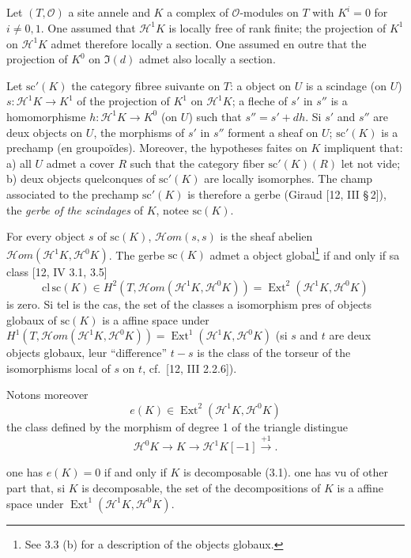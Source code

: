 \documentclass[12pt,a4paper]{article}
\theoremstyle{plain}
\theoremstyle{definition}
\theoremstyle{remark}
\DeclareMathOperator{\Ext}{Ext}
\newcommand{\cO}{\mathcal{O}}
\begin{document}
\subsection{}

Let $(T, \cO)$ a site annele and $K$ a complex of $\cO$-modules on $T$ with $K^i = 0$ for $i \neq 0, 1$. One assumed that $\mathscr{H}^1 K$ is locally free of rank finite; the projection of $K^1$ on $\mathscr{H}^1 K$ admet therefore locally a section. One assumed en outre that the projection of $K^0$ on $\Im(d)$ admet also locally a section.

Let $\mathrm{sc}'(K)$ the category fibree suivante on $T$: a object on $U$ is a scindage (on $U$) $s: \mathscr{H}^1 K \to K^1$ of the projection of $K^1$ on $\mathscr{H}^1 K$; a fleche of $s'$ in $s''$ is a homomorphisme $h: \mathscr{H}^1 K \to K^0$ (on $U$) such that $s'' = s' + dh$. Si $s'$ and $s''$ are deux objects on $U$, the morphisms of $s'$ in $s''$ forment a sheaf on $U$; $\mathrm{sc}'(K)$ is a prechamp (en groupo\"ides). Moreover, the hypotheses faites on $K$ impliquent that: a) all $U$ admet a cover $R$ such that the category fiber $\mathrm{sc}'(K)(R)$ let not vide; b) deux objects quelconques of $\mathrm{sc}'(K)$ are locally isomorphes. The champ associated to the prechamp $\mathrm{sc}'(K)$ is therefore a gerbe (Giraud [12, III \S\,2]), the \emph{gerbe of the scindages} of $K$, notee $\mathrm{sc}(K)$.

For every object $s$ of $\mathrm{sc}(K)$, $\mathscr{H}om(s,s)$ is the sheaf abelien $\mathscr{H}om(\mathscr{H}^1 K, \mathscr{H}^0 K)$. The gerbe $\mathrm{sc}(K)$ admet a object global\footnote{See 3.3 (b) for a description of the objects globaux.} if and only if sa class [12, IV 3.1, 3.5]
\[
\mathrm{cl}\, \mathrm{sc}(K) \in H^2(T, \mathscr{H}om(\mathscr{H}^1 K, \mathscr{H}^0 K)) = \Ext^2(\mathscr{H}^1 K, \mathscr{H}^0 K)
\]
is zero. Si tel is the cas, the set of the classes a isomorphism pres of objects globaux of $\mathrm{sc}(K)$ is a affine space under $H^1(T, \mathscr{H}om(\mathscr{H}^1 K, \mathscr{H}^0 K)) = \Ext^1(\mathscr{H}^1 K, \mathscr{H}^0 K)$ (si $s$ and $t$ are deux objects globaux, leur ``difference'' $t - s$ is the class of the torseur of the isomorphisms local of $s$ on $t$, cf.~[12, III 2.2.6]).

Notons moreover
\[
e(K) \in \Ext^2(\mathscr{H}^1 K, \mathscr{H}^0 K)
\]
the class defined by the morphism of degree 1 of the triangle distingue
\[
\mathscr{H}^0 K \to K \to \mathscr{H}^1 K[-1] \xrightarrow{+1}.
\]

one has $e(K) = 0$ if and only if $K$ is decomposable (3.1). one has vu of other part that, si $K$ is decomposable, the set of the decompositions of $K$ is a affine space under $\Ext^1(\mathscr{H}^1 K, \mathscr{H}^0 K)$.
\end{document}

